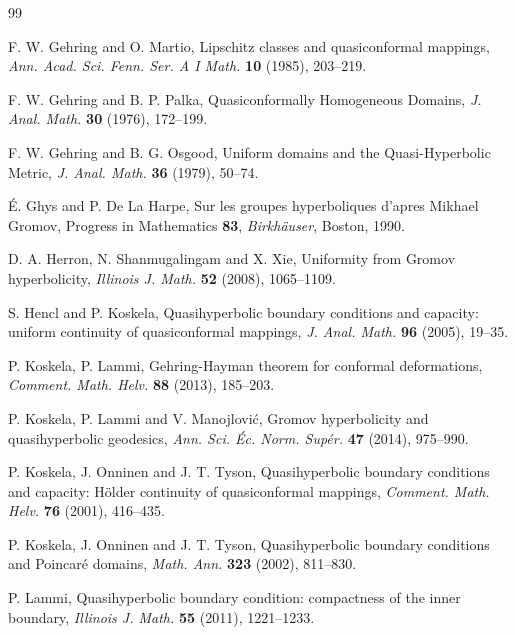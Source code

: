 \documentclass[a4paper,12pt]{amsart}
\theoremstyle{definition}
\begin{document}
\begin{thebibliography}{99}
		
		{\sc F. W. Gehring} and {\sc O. Martio}, Lipschitz classes and quasiconformal mappings, {\it Ann. Acad. Sci. Fenn. Ser. A I Math.} {\bf 10} (1985), 203--219. 
		
		{\sc F. W. Gehring} and {\sc B. P. Palka}, Quasiconformally Homogeneous Domains, {\it J. Anal. Math.} {\bf 30} (1976), 172--199.
		
		{\sc F. W. Gehring} and {\sc B. G. Osgood}, Uniform domains and the Quasi-Hyperbolic Metric, {\it J. Anal. Math.} {\bf 36} (1979), 50--74.
		
		
		
		
		{\sc \'E. Ghys} and {\sc P. De La Harpe}, Sur les groupes hyperboliques d'apres Mikhael Gromov, Progress in Mathematics {\bf 83}, {\it Birkh\"auser}, Boston, 1990.

		{\sc D. A. Herron}, {\sc N. Shanmugalingam} and {\sc X. Xie},
		Uniformity from Gromov hyperbolicity,
		{\it Illinois J. Math.} {\bf 52} (2008), 1065--1109.
		
		{\sc S. Hencl} and {\sc P. Koskela}, Quasihyperbolic boundary conditions and capacity: uniform continuity of quasiconformal mappings, {\it J. Anal. Math.} {\bf 96} (2005), 19--35.
		
		
		
		{\sc P. Koskela}, {\sc P. Lammi}, Gehring-Hayman theorem for conformal deformations, {\it Comment. Math. Helv.} {\bf 88} (2013), 185--203.
		
	{\sc P. Koskela}, {\sc P. Lammi} and {\sc V. Manojlovi\'c},
	Gromov hyperbolicity and quasihyperbolic geodesics,
	{\it Ann. Sci. \'Ec. Norm. Sup\'er.} {\bf 47} (2014), 975--990.
		
		{\sc P. Koskela}, {\sc J. Onninen} and {\sc J. T. Tyson}, Quasihyperbolic boundary conditions and capacity: H\"older continuity of quasiconformal mappings, {\it Comment. Math. Helv.} {\bf 76} (2001), 416--435.
		
		{\sc P. Koskela}, {\sc J. Onninen} and {\sc J. T. Tyson}, Quasihyperbolic boundary conditions and Poincar\'e domains, {\it Math. Ann.} {\bf 323} (2002), 811--830.
		
		
		
		{\sc P. Lammi}, Quasihyperbolic boundary condition: compactness of the inner boundary, {\it Illinois J. Math.} {\bf 55} (2011), 1221--1233.
		

\end{thebibliography}
\end{document}
